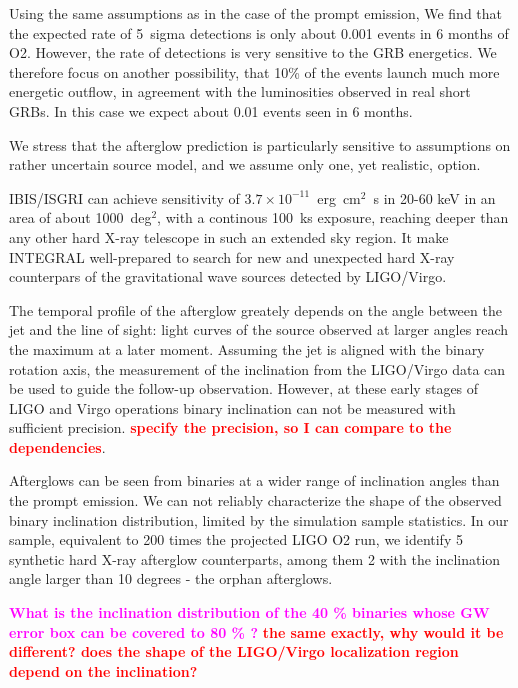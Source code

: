 \documentclass[11pt]{article}
\newcommand{\ECM}[1] {\textbf{\textcolor{magenta}{#1}}}
\newcommand{\vs}[1] {\textbf{\textcolor{red}{#1}}}
\begin{document}
Using the same assumptions as in the case of the prompt emission,
We find that the expected rate of 5~sigma detections is only about 0.001 events 
in 6 months of O2. However, the rate of detections is very sensitive to the GRB energetics.  We
therefore focus on another possibility, that 10\% of the events launch
much more energetic outflow, in agreement with the luminosities observed
in real short GRBs. In this case we expect about 0.01 events seen in 6
months.

We stress that the afterglow prediction is particularly sensitive to
assumptions on rather uncertain source model, and we assume only
one, yet realistic, option.

IBIS/ISGRI can achieve sensitivity of $3.7 \times 10^{-11}$~erg~cm$^2$~s
in 20-60 keV in an area of about 1000~deg$^{2}$, with a continous
100~ks exposure, reaching deeper than any other hard X-ray telescope
in such an extended sky region. It make INTEGRAL well-prepared to
search for new and unexpected hard X-ray counterpars of the gravitational wave
sources detected by LIGO/Virgo.

The temporal profile of the afterglow greately depends on the angle
between the jet and the line of sight: light curves of the source
observed at larger angles reach the maximum at a later
moment. Assuming the jet is aligned with the binary rotation axis, the
measurement of the inclination from the LIGO/Virgo data can be used to
guide the follow-up observation. However, at these early stages of LIGO and
Virgo operations binary inclination can not be measured with sufficient
precision. \vs{specify the precision, so I can compare to the
  dependencies}.

Afterglows can be seen from binaries at a wider range of inclination angles than the prompt emission.
We can not reliably characterize the shape of the observed binary
inclination distribution, limited by the simulation sample
statistics. In our sample, equivalent to 200 times the projected LIGO
O2 run, we identify 5 synthetic hard X-ray afterglow counterparts,
among them 2 with the inclination angle larger than 10 degrees - the orphan
afterglows.

\ECM{What is the inclination distribution of the 40 \% binaries whose GW error
  box can be covered to 80 \% ?}
\vs{the same exactly, why would it be different? does the shape of the LIGO/Virgo localization region depend on the inclination?
}


\vspace{10mm}
\end{document}
